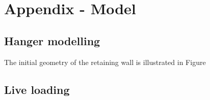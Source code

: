\section{Appendix - Model}
\label{AppendixA}

\subsection{Hanger modelling}
\label{Appendix_A_Hangers}
The initial geometry of the retaining wall is illustrated in Figure

\subsection{Live loading}
\label{Appendx_A_Live_loading}
